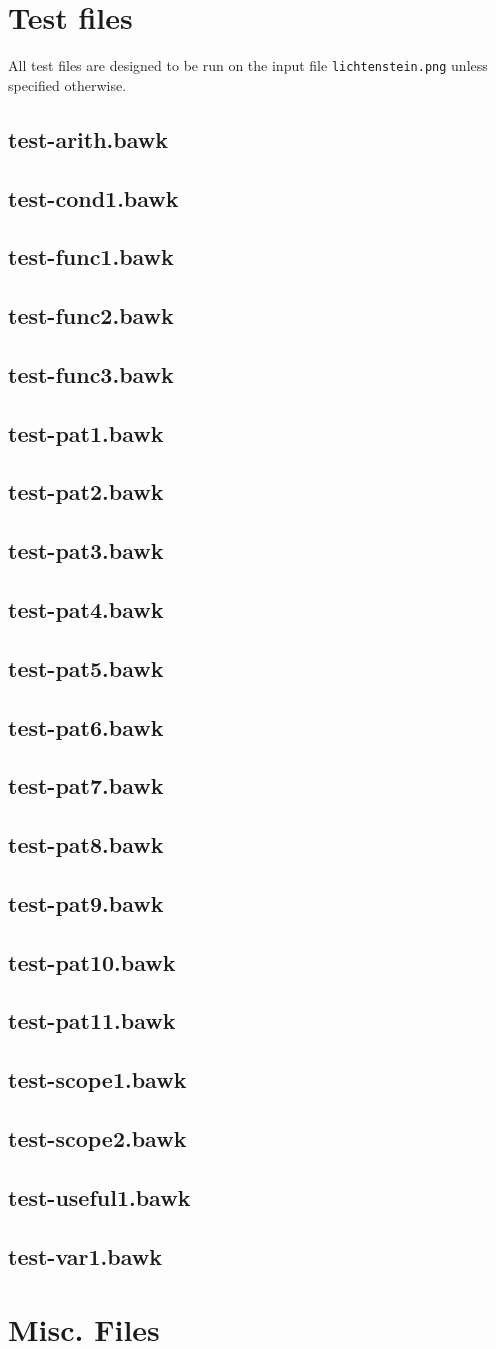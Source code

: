 \documentclass[letterpaper,11pt]{report}
\newcommand{\testfile}[1]{%
	\subsection{#1}
	
	}
\begin{document}
\section{Test files}
\label{sec:test-files}
All test files are designed to be run on the input file \texttt{lichtenstein.png} unless specified otherwise.  
\testfile{test-arith.bawk}
\testfile{test-cond1.bawk}
\testfile{test-func1.bawk}
\testfile{test-func2.bawk}
\testfile{test-func3.bawk}
\testfile{test-pat1.bawk}
\testfile{test-pat2.bawk}
\testfile{test-pat3.bawk}
\testfile{test-pat4.bawk}
\testfile{test-pat5.bawk}
\testfile{test-pat6.bawk}
\testfile{test-pat7.bawk}
\testfile{test-pat8.bawk}
\testfile{test-pat9.bawk}
\testfile{test-pat10.bawk}
\testfile{test-pat11.bawk}
\testfile{test-scope1.bawk}
\testfile{test-scope2.bawk}
\testfile{test-useful1.bawk}
\testfile{test-var1.bawk}

\section{Misc. Files}


\end{document}
